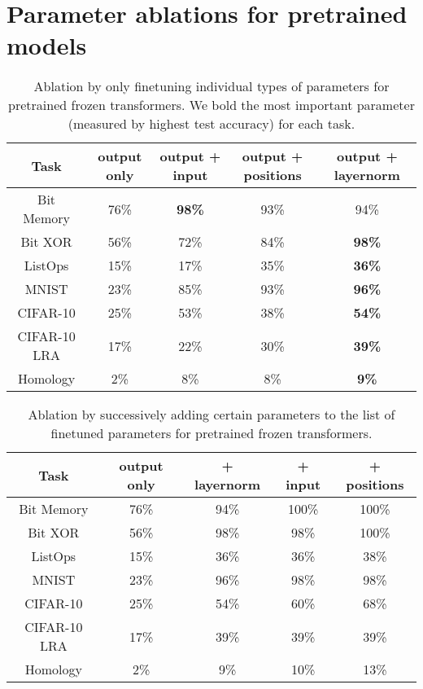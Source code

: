 
\section*{Parameter ablations for pretrained models}

\begin{table}[H] 
\begin{center}
\begin{tabular}{c|cccc}
\toprule
\textbf{Task} & \multicolumn{1}{c}{\bf output only} & \multicolumn{1}{c}{\bf output + input} & \multicolumn{1}{c}{\bf output + positions} & \multicolumn{1}{c}{\bf output + layernorm} \\
\midrule
Bit Memory & 76\% & \textbf{98\%} & 93\% & 94\% \\
Bit XOR & 56\% & 72\% & 84\% & \textbf{98\%} \\
ListOps & 15\% & 17\% & 35\% & \textbf{36\%} \\
MNIST & 23\% & 85\% & 93\% & \textbf{96\%} \\
CIFAR-10 & 25\% & 53\% & 38\% & \textbf{54\%} \\
CIFAR-10 LRA & 17\% & 22\% & 30\% & \textbf{39\%} \\
Homology & 2\% &  8\% &  8\% & \textbf{9\%} \\
\bottomrule
\end{tabular}
\end{center}
\caption{Ablation by only finetuning individual types of parameters for pretrained frozen transformers. We bold the most important parameter (measured by highest test accuracy) for each task.}\label{table:finetuning_indep}
\end{table}

\begin{table}[H]
\begin{center}
\begin{tabular}{c|cccc}
\toprule
\textbf{Task} & \multicolumn{1}{c}{\bf output only} & \multicolumn{1}{c}{\bf + layernorm} & \multicolumn{1}{c}{\bf + input} & \multicolumn{1}{c}{\bf + positions} \\
\midrule
Bit Memory & 76\% & 94\% & 100\% & 100\% \\
Bit XOR & 56\% & 98\% & 98\% & 100\% \\
ListOps & 15\% & 36\% & 36\% & 38\% \\
MNIST & 23\% & 96\% & 98\% & 98\% \\
CIFAR-10 & 25\% & 54\% & 60\% & 68\% \\
CIFAR-10 LRA & 17\% & 39\% & 39\% & 39\% \\
Homology & 2\% & 9\% & 10\% & 13\% \\
\bottomrule
\end{tabular}
\end{center}
\caption{Ablation by successively adding certain parameters to the list of finetuned parameters for pretrained frozen transformers.}\label{table:finetuning_add}
\end{table}

